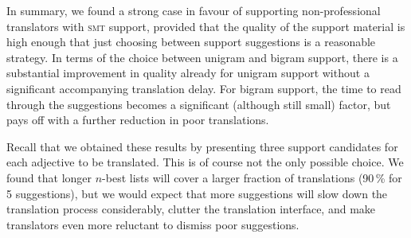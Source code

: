 \documentclass[output=paper]{LSP/langsci}
\begin{document}
%
%
%

In summary, we found a strong case in favour of supporting
non-professional translators with \textsc{smt} support, provided that
the quality of the support material is high enough that just choosing
between support suggestions is a reasonable strategy. In terms of the
choice between unigram and bigram support, there is a substantial
improvement in quality already for unigram support without a
significant accompanying translation delay. For bigram support, the time to read
through the suggestions becomes a significant (although still small)
factor, but pays off with a further reduction in poor translations.

Recall that we obtained these results by presenting three support
candidates for each adjective to be translated. This is of course not
the only possible choice. We found that longer $n$-best lists will
cover a larger fraction of translations (90\,\% for 5 suggestions), but we
would expect that more suggestions will slow down the translation
process considerably, clutter the translation interface, and make
translators even more reluctant to dismiss poor suggestions.
\end{document}
